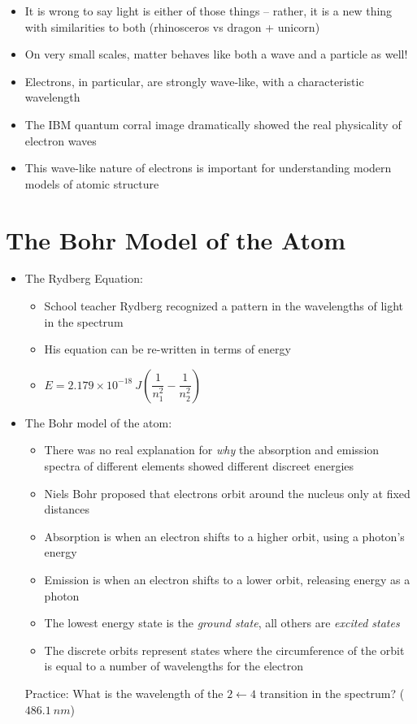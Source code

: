 \documentclass[12pt, openany, letterpaper]{memoir}
\begin{document}
\begin{itemize}
\begin{itemize}
		\item It is wrong to say light is either of those things -- rather, it is a new thing with similarities to both (rhinosceros vs dragon + unicorn)
		\item On very small scales, matter behaves like both a wave and a particle as well!
		\item Electrons, in particular, are strongly wave-like, with a characteristic wavelength
		\item The IBM quantum corral image dramatically showed the real physicality of electron waves
		\item This wave-like nature of electrons is important for understanding modern models of atomic structure
	\end{itemize}
\end{itemize}
\section{The Bohr Model of the Atom}
\begin{itemize}
	\item The Rydberg Equation:
	\begin{itemize}
		\item School teacher Rydberg recognized a pattern in the wavelengths of light in the  spectrum
		\item His equation can be re-written in terms of energy
		\item $E=2.179\times10^{-18}~J\left(\dfrac{1}{n_1^2}-\dfrac{1}{n_2^2}\right)$
	\end{itemize}
	\item The Bohr model of the atom:
	\begin{itemize}
		\item There was no real explanation for \emph{why} the absorption and emission spectra of different elements showed different discreet energies
		\item Niels Bohr proposed that electrons orbit around the nucleus only at fixed distances
		\item Absorption is when an electron shifts to a higher orbit, using a photon's energy
		\item Emission is when an electron shifts to a lower orbit, releasing energy as a photon
		\item The lowest energy state is the \emph{ground state}, all others are \emph{excited states}
		\item The discrete orbits represent states where the circumference of the orbit is equal to a number of wavelengths for the electron
	\end{itemize}
	Practice: What is the wavelength of the $2\leftarrow4$ transition in the  spectrum? ($486.1~nm$)
\end{itemize}
\end{document}
